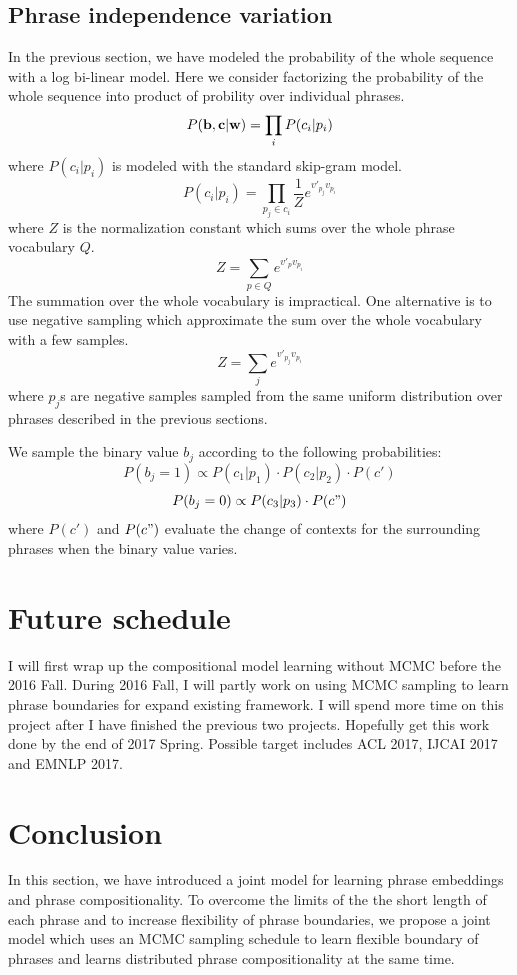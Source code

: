 \subsection{Phrase independence variation}
In the previous section, we have modeled the probability of the whole sequence with a log bi-linear model. Here we consider factorizing the probability of the whole sequence into product of probility over individual phrases.
\begin{equation}
P({\bf b},{\bf c}|{\bf w}) = \prod_i P(c_i| p_i)
\end{equation}
where $P(c_i| p_i)$ is modeled with the standard skip-gram model.
\begin{equation}
P(c_i| p_i) = \prod_{p_j \in c_i} \frac{1}{Z} e^{v'_{p_j} v_{p_i}}
\end{equation}
where $Z$ is the normalization constant which sums over the whole phrase vocabulary $Q$.
\begin{equation}
Z = \sum_{p \in Q}e^{v'_p v_{p_i}}
\end{equation}
The summation over the whole vocabulary is impractical. One alternative is to use negative sampling which approximate the sum over the whole vocabulary with a few samples.
$$Z = \sum_{j} e^{v'_{p_j} v_{p_i}}$$
where $p_j$s are negative samples sampled from the same uniform distribution over phrases described in the previous sections.


We sample the binary value $b_j$ according to the following probabilities:
$$P(b_j = 1) \propto P(c_1 | p_1) \cdot P(c_2 | p_2) \cdot P(c')$$
$$P(b_j = 0) \propto P(c_3 | p_3)\cdot P(c")$$
where $P(c')$ and $P(c")$ evaluate the change of contexts for the surrounding phrases when the binary value varies.

\section{Future schedule}
I will first wrap up the compositional model learning without MCMC before the 2016 Fall. During 2016 Fall, I will partly work on using MCMC sampling to learn phrase boundaries for expand existing framework.
I will spend more time on this project after I have finished the previous two projects. Hopefully get this work done by the end of 2017 Spring. Possible target includes ACL 2017, IJCAI 2017 and EMNLP 2017.
\section{Conclusion}
In this section, we have introduced a joint model for learning phrase embeddings and phrase compositionality. To overcome the limits of the the short length of each phrase and to increase flexibility of 
phrase boundaries, we propose a joint model which uses an MCMC sampling schedule to learn flexible boundary of phrases and learns distributed phrase compositionality at the same time.
